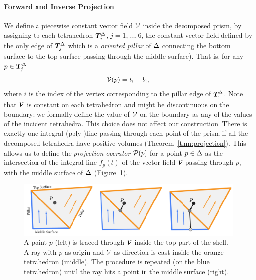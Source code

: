 \paragraph{Forward and Inverse Projection}
We define a piecewise constant vector field $\V$ inside the decomposed prism,
by assigning to each tetrahedron $\Tet_j^{\Prism}$, $j=1,\hdots,6$,
the constant vector field defined by the only edge of $\Tet_j^{\Prism}$ which is a \emph{oriented pillar} of $\Prism$ connecting the bottom surface to the top surface passing through the middle surface). That is, for any $p\in \Tet_j^{\Prism}$
\begin{equation}
    \label{eq:V}
    \V(p) = t_i - b_i,
\end{equation}
where $i$ is the index of the vertex corresponding to the pillar edge of $\Tet_j^{\Prism}$.
Note that {$\V$ is constant on each tetrahedron and might be discontinuous on the boundary: we formally define the value of $\V$ on the boundary as any of the values of the incident tetrahedra. This choice does not affect our construction.}
{T}here is exactly one {integral (poly-)line} passing through each point of the prism if
all the decomposed tetrahedra have positive volumes
(Theorem~\ref{thm:projection}). This allows us to define
the \emph{projection operator} $\P(p)$ for a point $p \in \Prism$ as the intersection of the {integral line} $f_p(t)$ of the vector field $\V$ passing through $p$, with the middle surface of $\Prism$ (Figure~\ref{prism:fig:advection}). 
%
\begin{figure}
    \includegraphics[width=\linewidth]{prism-tex/figs/projection}
    \caption{A point $p$ (left) is traced through $\V$ inside the top part of the shell. A ray with $p$ as origin and $\V$ as direction is cast inside the orange tetrahedron (middle). The procedure is repeated (on the blue tetrahedron) until the ray hits a point in the middle surface (right).}
    \label{prism:fig:advection}
    
\end{figure}
%

